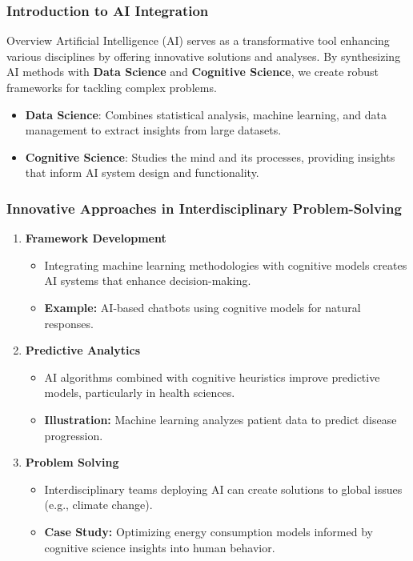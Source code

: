 \documentclass[aspectratio=169]{beamer}
\begin{document}
\begin{frame}[fragile]
    \frametitle{Introduction to AI Integration}
    \begin{block}{Overview}
        Artificial Intelligence (AI) serves as a transformative tool enhancing various disciplines by offering innovative solutions and analyses. By synthesizing AI methods with \textbf{Data Science} and \textbf{Cognitive Science}, we create robust frameworks for tackling complex problems.
    \end{block}
    
    \begin{itemize}
        \item \textbf{Data Science}: Combines statistical analysis, machine learning, and data management to extract insights from large datasets.
        \item \textbf{Cognitive Science}: Studies the mind and its processes, providing insights that inform AI system design and functionality.
    \end{itemize}
\end{frame}

\begin{frame}[fragile]
    \frametitle{Innovative Approaches in Interdisciplinary Problem-Solving}
    \begin{enumerate}
        \item \textbf{Framework Development}
        \begin{itemize}
            \item Integrating machine learning methodologies with cognitive models creates AI systems that enhance decision-making.
            \item \textbf{Example:} AI-based chatbots using cognitive models for natural responses.
        \end{itemize}
        
        \item \textbf{Predictive Analytics}
        \begin{itemize}
            \item AI algorithms combined with cognitive heuristics improve predictive models, particularly in health sciences.
            \item \textbf{Illustration:} Machine learning analyzes patient data to predict disease progression.
        \end{itemize}
        
        \item \textbf{Problem Solving}
        \begin{itemize}
            \item Interdisciplinary teams deploying AI can create solutions to global issues (e.g., climate change).
            \item \textbf{Case Study:} Optimizing energy consumption models informed by cognitive science insights into human behavior.
        \end{itemize}
    \end{enumerate}
\end{frame}
\end{document}
